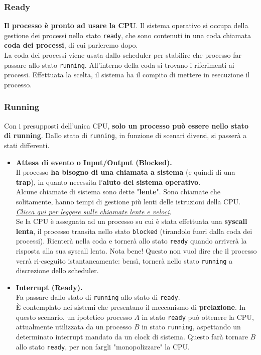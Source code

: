\documentclass{report}
\begin{document}
\subsubsection{Ready}
\textbf{Il processo è pronto ad usare la CPU}. Il sistema operativo si occupa della gestione dei processi nello stato \verb|ready|, che sono contenuti in una coda chiamata \textbf{coda dei processi}, di cui parleremo dopo.\\
La coda dei processi viene usata dallo scheduler per stabilire che processo far passare allo stato \verb|running|. All'interno della coda si trovano i riferimenti ai processi.
Effettuata la scelta, il sistema ha il compito di mettere in esecuzione il processo.
\newpage

\subsubsection{Running}
Con i presupposti dell'unica CPU, \textbf{solo un processo può essere nello stato di running}. Dallo stato di \verb|running|, in funzione di scenari diversi, si passerà a stati differenti.

\begin{itemize}
    \item \textbf{Attesa di evento o Input/Output (Blocked).}\\
    Il processo \textbf{ha bisogno di una chiamata a sistema} (e quindi di una \textbf{trap}), in quanto necessita l'\textbf{aiuto del sistema operativo}.\\
    Alcune chiamate di sistema sono dette "\textbf{lente}". Sono chiamate che solitamente, hanno tempi di gestione più lenti delle istruzioni della CPU.
    \\
    \textit{\href{https://unix.stackexchange.com/questions/14293/difference-between-slow-system-calls-and-fast-system-calls}{Clicca qui per leggere sulle chiamate lente e veloci}}.\\
    Se la CPU è assegnata ad un processo su cui è stata effettuata una \textbf{syscall lenta}, il processo transita nello stato \verb|blocked| (tirandolo fuori dalla coda dei processi). Rienterà nella coda e tornerà allo stato \verb|ready| quando arriverà la risposta alla sua syscall lenta.
    Nota bene! Questo non vuol dire che il processo verrà ri-eseguito istantaneamente: bensì, tornerà nello stato \verb|running| a discrezione dello scheduler. 
    \item \textbf{Interrupt (Ready).}\\
    Fa passare dallo stato di \verb|running| allo stato di \verb|ready|.\\ È contemplato nei sistemi che presentano il meccanismo di \textbf{prelazione}. In questo scenario, un ipotetico processo $A$ in stato \verb|ready| può ottenere la CPU, attualmente utilizzata da un processo $B$ in stato \verb|running|, aspettando un determinato interrupt mandato da un clock di sistema. Questo farà tornare $B$ allo stato \verb|ready|, per non fargli "monopolizzare" la CPU.
\end{itemize}
\end{document}
